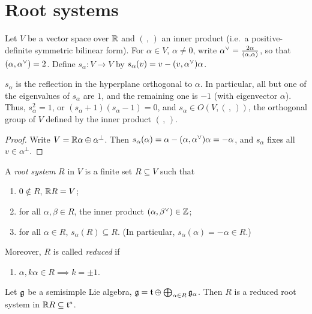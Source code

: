 \section{Root systems}

Let $V$ be a vector space over $\mathbb{R}$ and $(\,,\,)$ an inner product (i.e.\ a
positive-definite symmetric bilinear form). For $\alpha \in V$,
$\alpha \neq 0$, write $\alpha^{\vee} = \frac{2\alpha}{(\alpha, \alpha)}$, so that
$(\alpha, \alpha^{\vee}) = 2$. Define $s_\alpha\colon V \to V$ by
$s_\alpha(v) = v - (v, \alpha^{\vee})\alpha$.

\begin{lemma}
$s_\alpha$ is the reflection in the hyperplane orthogonal to $\alpha$. In
particular, all but one of the eigenvalues of $s_\alpha$ are $1$, and the
remaining one is $-1$ (with eigenvector $\alpha$). Thus, $s_\alpha^2 = 1$, or
$(s_\alpha + 1)(s_\alpha - 1) = 0$, and $s_\alpha \in O(V, (\,,\,))$, the
orthogonal group of $V$ defined by the inner product $(\,,\,)$.
\end{lemma}

\begin{proof}
Write $V = \mathbb{R}\alpha \oplus \alpha^\perp$. Then
$s_\alpha(\alpha) = \alpha - (\alpha, \alpha^{\vee})\alpha = -\alpha$, and
$s_\alpha$ fixes all $v \in \alpha^\perp$.
\end{proof}

\begin{definition}
A \emph{root system} $R$ in $V$ is a finite set $R \subseteq V$ such that
\begin{enumerate}
  \item $0 \notin R$, $\mathbb{R} R = V$;
  \item for all $\alpha, \beta \in R$, the inner product $(\alpha, \beta^{\vee}) \in \mathbb{Z}$;
  \item for all $\alpha \in R$, $s_\alpha(R) \subseteq R$. (In particular,
    $s_\alpha(\alpha) = -\alpha \in R$.)
\end{enumerate}
Moreover, $R$ is called \emph{reduced} if
\begin{enumerate}[resume]
  \item $\alpha, k\alpha \in R \implies k = \pm 1$.
\end{enumerate}
\end{definition}

\begin{example}
Let $\mathfrak{g}$ be a semisimple Lie algebra, $\mathfrak{g} = \mathfrak{t} \oplus \bigoplus_{\alpha \in R} \mathfrak{g}_\alpha$.
Then $R$ is a reduced root system in $\mathbb{R} R \subseteq \mathfrak{t}^*$.
\end{example}

